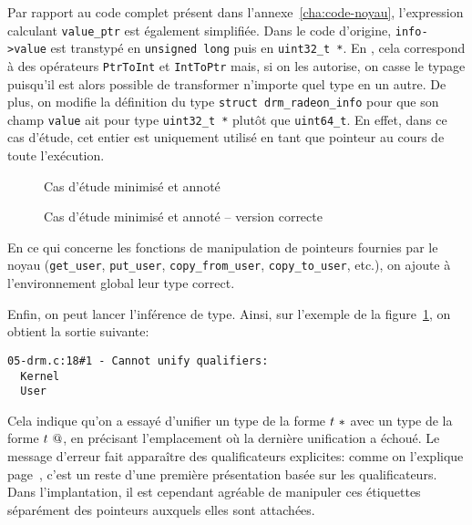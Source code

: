 Par rapport au code complet présent dans l'annexe~\ref{cha:code-noyau},
l'expression calculant \texttt{value_ptr} est également simplifiée. Dans le code
d'origine, \texttt{info->value} est transtypé en \texttt{unsigned long} puis en
\texttt{uint32\_t *}. En \newspeak, cela correspond à des opérateurs
\texttt{PtrToInt} \linebreak et \texttt{IntToPtr} mais, si on les autorise, on
casse le typage puisqu'il est alors possible de transformer n'importe quel type
en un autre. De plus, on modifie la définition du type \texttt{struct
drm\_radeon\_info} pour que son champ \texttt{value} ait pour type
\texttt{uint32\_t *} plutôt que \texttt{uint64\_t}. En effet, dans ce cas
d'étude, cet entier est uniquement utilisé en tant que pointeur au cours de
toute l'exécution.

\begin{figure}[p]

\caption{Cas d'étude minimisé et annoté}
\label{fig:ex-drm}
\end{figure}

\begin{figure}[p]


    \caption{Cas d'étude minimisé et annoté -- version correcte}
    \label{fig:ex-drm-ok}

\end{figure}

En ce qui concerne les fonctions de manipulation de pointeurs fournies
par le noyau (\texttt{get\_user}, \texttt{put\_user},
\texttt{copy\_from\_user}, \texttt{copy\_to\_user}, etc.), on ajoute à
l'environnement global leur type correct.

Enfin, on peut lancer l'inférence de type. Ainsi, sur l'exemple de la
figure~\ref{fig:ex-drm}, on obtient la sortie suivante:

\begin{Verbatim}
05-drm.c:18#1 - Cannot unify qualifiers:
  Kernel
  User
\end{Verbatim}

Cela indique qu'on a essayé d'unifier un type de la forme $t~*$ avec un
type de la forme $t~@$, en précisant l'emplacement où la dernière
unification a échoué. Le message d'erreur fait apparaître des qualificateurs
explicites: comme on l'explique page~\pageref{page:qualifs-pas-qualifs}, c'est
un reste d'une première présentation basée sur les qualificateurs.
Dans l'implantation, il est cependant agréable de manipuler ces étiquettes
séparément des pointeurs auxquels elles sont attachées.

